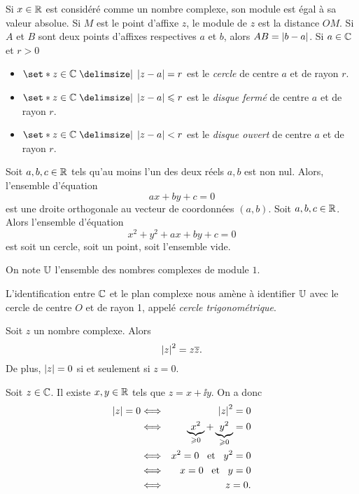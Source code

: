 \documentclass{magnolia}
\begin{document}
\begin{remarques}
\remarque Si $x\in\mathbb{R}$ est considéré comme un nombre complexe, son module est égal à sa valeur absolue.
\remarque Si $M$ est le point d'affixe $z$, le module de $z$ est la distance $OM$. Si $A$ et $B$ sont deux points d'affixes respectives $a$ et $b$, alors $AB=\left|b-a\right|$.
\remarque Si $a\in\mathbb{C}$ et $r>0$
  \begin{itemize}
  \item $\enstq{z\in\C}{\abs{z-a}=r}$ est le \emph{cercle} de centre $a$ et de rayon $r$.
  \item $\enstq{z\in\C}{\abs{z-a}\leq r}$ est le \emph{disque fermé} de centre $a$ et de rayon $r$.
  \item $\enstq{z\in\C}{\abs{z-a}<r}$ est le \emph{disque ouvert} de centre $a$ et de rayon $r$.
  \end{itemize}
  \remarque Soit $a,b,c\in\mathbb{R}$ tels qu'au moins l'un des deux réels $a,b$ est non nul.
  Alors, l'ensemble d'équation
  \[ax+by+c=0\]
  est une droite orthogonale au vecteur de coordonnées $(a,b)$.
\remarque Soit $a,b,c\in\mathbb{R}$. Alors l'ensemble d'équation
  \[x^2+y^2+ax+by+c=0\]
  est soit un cercle, soit un point, soit l'ensemble vide.
\end{remarques}

\begin{definition}[utile=-3]
On note $\U$ l'ensemble des nombres complexes de module $1$.
\end{definition}

\begin{remarqueUnique}
\remarque L'identification entre $\mathbb{C}$ et le plan complexe nous amène à identifier $\U$
  avec le cercle de centre $O$ et de rayon 1, appelé \emph{cercle trigonométrique}.
\end{remarqueUnique}

\begin{proposition}
Soit $z$ un nombre complexe. Alors
\[\left|z\right|^2=z \overline{z}.\]
De plus, $\left|z\right|=0$ si et seulement si $z=0$.
\end{proposition}
\begin{preuve}
Soit $z\in\mathbb{C}$. Il existe $x,y\in\mathbb{R}$ tels que $z=x+\ii y$. On a donc
\begin{eqnarray*}
\left|z\right|=0
&\Longleftrightarrow& \left|z\right|^2=0\\
&\Longleftrightarrow& \underbrace{x^2}_{\geqslant 0}+\underbrace{y^2}_{\geqslant 0}=0\\
&\Longleftrightarrow& x^2=0 \quad\!\text{et}\quad\! y^2=0\\
&\Longleftrightarrow& x=0 \quad\!\text{et}\quad\! y=0\\
&\Longleftrightarrow& z=0.
\end{eqnarray*}
\end{preuve}
\end{document}
